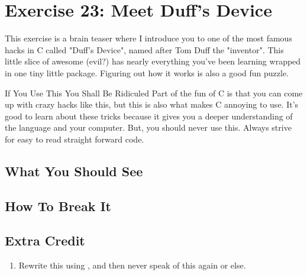\chapter{Exercise 23: Meet Duff's Device}

This exercise is a brain teaser where I introduce you to one of the
most famous hacks in C called "Duff's Device", named after Tom Duff
the "inventor".  This little slice of awesome (evil?) has nearly everything
you've been learning wrapped in one tiny little package.  Figuring out
how it works is also a good fun puzzle.

\begin{aside}{If You Use This You Shall Be Ridiculed}
Part of the fun of C is that you can come up with crazy hacks like this,
but this is also what makes C annoying to use.  It's good to learn about
these tricks because it gives you a deeper understanding of
the language and your computer.  But, you should never use this.  Always
strive for easy to read straight forward code.
\end{aside}

\section{What You Should See}


\section{How To Break It}


\section{Extra Credit}

\begin{enumerate}
\item Rewrite this using , and then never speak of this again
    or else.
\end{enumerate}

